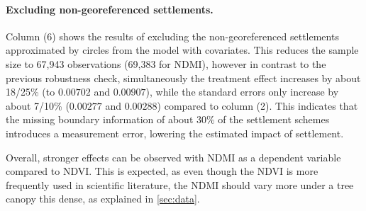 \paragraph{Excluding non-georeferenced settlements.}
Column (6) shows the results of excluding the non-georeferenced settlements approximated by circles from the model with covariates.
This reduces the sample size to 67,943 observations (69,383 for NDMI), however in contrast to the previous robustness check,
simultaneously the treatment effect increases by about 18/25\% (to $0.00702$ and $0.00907$), while the standard errors only increase by about 7/10\% ($0.00277$ and $0.00288$) compared to column (2).
This indicates that the missing boundary information of about 30\% of the settlement schemes introduces a measurement error, lowering the estimated impact of settlement.

Overall, stronger effects can be observed with NDMI as a dependent variable compared to NDVI.
This is expected, as even though the NDVI is more frequently used in scientific literature, the NDMI should vary more under a tree canopy this dense, as explained in \cref{sec:data}.